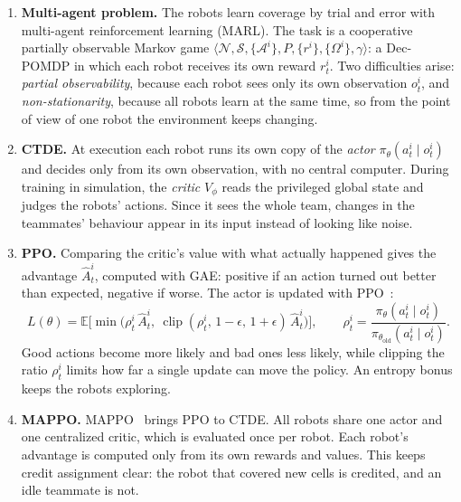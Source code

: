 \documentclass[11pt,a4paper]{article}
\begin{document}
\begin{enumerate}[label=\textbf{\arabic*.},resume]

\item \textbf{Multi-agent problem.}
The robots learn coverage by trial and error with multi-agent reinforcement
learning (MARL). The task is a cooperative partially observable Markov game
$\langle \mathcal{N}, \mathcal{S}, \{\mathcal{A}^i\}, P, \{r^i\},
\{\Omega^i\}, \gamma \rangle$: a Dec-POMDP in which each robot receives its
own reward $r^i_t$. Two difficulties arise: \emph{partial observability},
because each robot sees only its own observation $o^i_t$, and
\emph{non-stationarity}, because all robots learn at the same time, so from
the point of view of one robot the environment keeps changing.

\item \textbf{CTDE.}
At execution each robot runs its own copy of the \emph{actor}
$\pi_\theta(a^i_t\mid o^i_t)$ and decides only from its own observation,
with no central computer. During training in simulation, the \emph{critic}
$V_\phi$ reads the privileged global state and judges the robots' actions.
Since it sees the whole team, changes in the teammates' behaviour appear in
its input instead of looking like noise.

\item \textbf{PPO.}
Comparing the critic's value with what actually happened gives the
advantage $\hat{A}^i_t$, computed with GAE: positive if an action turned out
better than expected, negative if worse. The actor is updated with
PPO~\cite{schulman2017proximal}:
\[
  L(\theta) = \mathbb{E}\Big[\min\big(\rho^i_t\,\hat{A}^i_t,\
  \operatorname{clip}(\rho^i_t,\,1-\epsilon,\,1+\epsilon)\,\hat{A}^i_t\big)\Big],
  \qquad
  \rho^i_t = \frac{\pi_\theta(a^i_t\mid o^i_t)}{\pi_{\theta_{\text{old}}}(a^i_t\mid o^i_t)} .
\]
Good actions become more likely and bad ones less likely, while clipping the
ratio $\rho^i_t$ limits how far a single update can move the policy. An
entropy bonus keeps the robots exploring.

\item \textbf{MAPPO.}
MAPPO~\cite{yu2022surprising} brings PPO to CTDE. All robots share one actor
and one centralized critic, which is evaluated once per robot. Each robot's
advantage is computed only from its own rewards and values. This keeps
credit assignment clear: the robot that covered new cells is credited, and
an idle teammate is not.


\end{enumerate}
\end{document}
